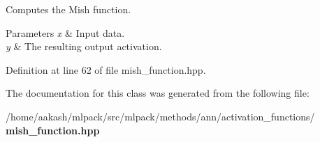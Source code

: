Computes the Mish function. 


\begin{DoxyParams}{Parameters}
{\em x} & Input data. \\
\hline
{\em y} & The resulting output activation. \\
\hline
\end{DoxyParams}


Definition at line 62 of file mish\+\_\+function.\+hpp.



The documentation for this class was generated from the following file\+:\begin{DoxyCompactItemize}
\item 
/home/aakash/mlpack/src/mlpack/methods/ann/activation\+\_\+functions/\textbf{ mish\+\_\+function.\+hpp}\end{DoxyCompactItemize}
